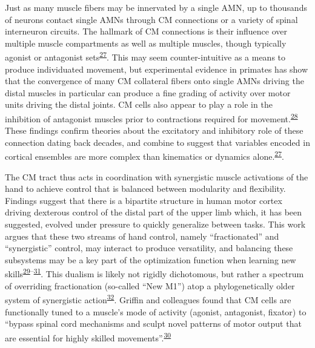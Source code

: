 \documentclass[
  a4paper,
]{article}
\begin{document}
Just as many muscle fibers may be innervated by a single AMN, up to
thousands of neurons contact single AMNs through CM connections or a
variety of spinal interneuron circuits. The hallmark of CM connections
is their influence over multiple muscle compartments as well as multiple
muscles, though typically agonist or antagonist
sets\textsuperscript{\protect\hyperlink{ref-cheneyFunctionalClassesPrimate1980}{27}}.
This may seem counter-intuitive as a means to produce individuated
movement, but experimental evidence in primates has show that the
convergence of many CM collateral fibers onto single AMNs driving the
distal muscles in particular can produce a fine grading of activity over
motor units driving the distal joints. CM cells also appear to play a
role in the inhibition of antagonist muscles prior to contractions
required for
movement.\textsuperscript{\protect\hyperlink{ref-griffinMotorCortexUses2020}{28}}
These findings confirm theories about the excitatory and inhibitory role
of these connection dating back decades, and combine to suggest that
variables encoded in cortical ensembles are more complex than kinematics
or dynamics
alone.\textsuperscript{\protect\hyperlink{ref-cheneyFunctionalClassesPrimate1980}{27}}.

The CM tract thus acts in coordination with synergistic muscle
activations of the hand to achieve control that is balanced between
modularity and flexibility. Findings suggest that there is a bipartite
structure in human motor cortex driving dexterous control of the distal
part of the upper limb which, it has been suggested, evolved under
pressure to quickly generalize between tasks. This work argues that
these two streams of hand control, namely ``fractionated'' and
``synergistic'' control, may interact to produce versatility, and
balancing these subsystems may be a key part of the optimization
function when learning new
skills\textsuperscript{\protect\hyperlink{ref-Rathelot2009}{29}--\protect\hyperlink{ref-Takei2017}{31}}.
This dualism is likely not rigidly dichotomous, but rather a spectrum of
overriding fractionation (so-called ``New M1'') atop a phylogenetically
older system of synergistic
action\textsuperscript{\protect\hyperlink{ref-dumCorticospinalSystemStructural2011}{32}}.
Griffin and colleagues found that CM cells are functionally tuned to a
muscle's mode of activity (agonist, antagonist, fixator) to ``bypass
spinal cord mechanisms and sculpt novel patterns of motor output that
are essential for highly skilled
movements''.\textsuperscript{\protect\hyperlink{ref-griffinCorticomotoneuronalCellsAre2015}{30}}
\end{document}
